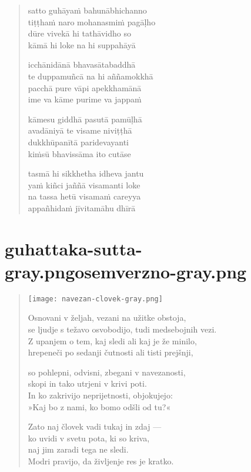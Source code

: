 

\cleartoverso

\vspace*{30mm}

\begin{verse}

satto guhāyaṁ bahunābhichanno\\
tiṭṭhaṁ naro mohanasmiṁ pagāḷho\\
dūre vivekā hi tathāvidho so\\
kāmā hi loke na hi suppahāyā

icchānidānā bhavasātabaddhā\\
te duppamuñcā na hi aññamokkhā\\
pacchā pure vāpi apekkhamānā\\
ime va kāme purime va jappaṁ

kāmesu giddhā pasutā pamūḷhā\\
avadāniyā te visame niviṭṭhā\\
dukkhūpanītā paridevayanti\\
kiṁsū bhavissāma ito cutāse

tasmā hi sikkhetha idheva jantu\\
yaṁ kiñci jaññā visamanti loke\\
na tassa hetū visamaṁ careyya\\
appañhidaṁ jīvitamāhu dhīrā

\end{verse}


\chapter[Guhaṭṭaka Sutta]{{guhattaka-sutta-gray.png}{osemverzno-gray.png}}

\begin{verse}

\vFirst
\hskip -3mm \texttt{[image: navezan-clovek-gray.png]}

Osnovani v željah, vezani na užitke obstoja,\\
se ljudje s težavo osvobodijo, tudi medsebojnih vezi.\\
Z upanjem o tem, kaj sledi ali kaj je že minilo,\\
hrepeneči po sedanji čutnosti ali tisti prejšnji,

so pohlepni, odvisni, zbegani v navezanosti,\\
skopi in tako utrjeni v krivi poti.\\
In ko zakrivijo neprijetnosti, objokujejo:\\
»Kaj bo z nami, ko bomo odšli od tu?«

Zato naj človek vadi tukaj in zdaj —\\
ko uvidi v svetu pota, ki so kriva,\\
naj jim zaradi tega ne sledi.\\
Modri pravijo, da življenje res je kratko.

\end{verse}

